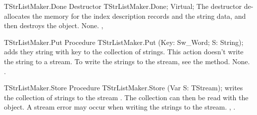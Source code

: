 \begin{procedure}{TStrListMaker.Done}
\Declaration
Destructor TStrListMaker.Done; Virtual;
\Description
The  destructor de-allocates the memory for the index description
records and the string data, and then destroys the object. 
\Errors
None.
\SeeAlso
{}, 
\end{procedure}

\begin{procedure}{TStrListMaker.Put}
\Declaration
Procedure TStrListMaker.Put (Key: Sw\_Word; S: String);
\Description
{} adds they string  with key  to the collection of
strings. This action doesn't write the string to a stream. To write the
strings to the stream, see the  method.
\Errors
None.
\SeeAlso
{}.
\end{procedure}

\begin{procedure}{TStrListMaker.Store}
\Declaration
Procedure TStrListMaker.Store (Var S: TStream);
\Description
{} writes the collection of strings to the stream .
The collection can then be read with the  object.
\Errors
A stream error may occur when writing the strings to the stream.
\SeeAlso
{}, .
\end{procedure}


